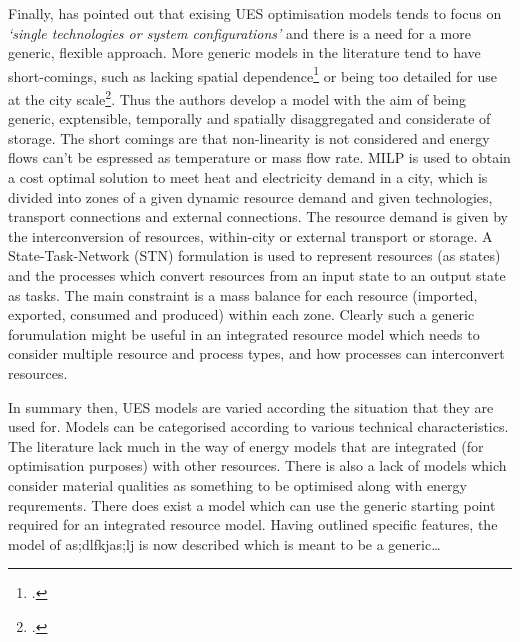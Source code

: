 Finally, \citet{Samsatli} has pointed out that exising UES optimisation models tends to focus on \emph{`single technologies or system configurations'} and there is a need for a more generic, flexible approach. More generic models in the literature tend to have short-comings, such as lacking spatial dependence\footnote{\citet{Ren2010}.} or being too detailed for use at the city scale\footnote{\citet{Weber2011}.}. Thus the authors develop a model with the aim of being generic, exptensible, temporally and spatially disaggregated and considerate of storage. The short comings are that non-linearity is not considered and energy flows can't be espressed as temperature or mass flow rate. MILP is used to obtain a cost optimal solution to meet heat and electricity demand in a city, which is divided into zones of a given dynamic resource demand and given technologies, transport connections and external connections. The resource demand is given by the interconversion of resources, within-city or external transport or storage. A State-Task-Network (STN) formulation is used to represent resources (as states) and the processes which convert resources from an input state to an output state as tasks. The main constraint is a mass balance for each resource (imported, exported, consumed and produced) within each zone. Clearly such a generic forumulation might be useful in an integrated resource model which needs to consider multiple resource and process types, and how processes can interconvert resources.

In summary then, UES models are varied according the situation that they are used for. Models can be categorised according to various technical characteristics. The literature lack much in the way of energy models that are integrated (for optimisation purposes) with other resources. There is also a lack of models which consider material qualities as something to be optimised along with energy requrements. There does exist a model which can use the generic starting point required for an integrated resource model.
Having outlined specific features, the model of as;dlfkjas;lj is now described which is meant to be a generic\ldots

